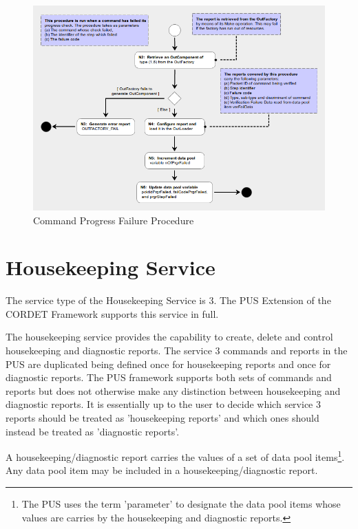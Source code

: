 \documentclass[a4paper,10pt]{article}
\let\stdsection\section
\renewcommand\section{\newpage\stdsection}
\begin{document}
\begin{figure}[H]
 \centering
 \includegraphics[scale=0.415,keepaspectratio=true]{CrPsCmdPrgrFail.png}
 \caption{Command Progress Failure Procedure}
 \label{fig:CmdPrgrFail}
\end{figure}

\section{Housekeeping Service}\label{sec:serv3}
The service type of the Housekeeping Service is 3. The PUS Extension of the CORDET Framework supports this service in full.

The housekeeping service provides the capability to create, delete and control housekeeping and diagnostic reports. The service 3 commands and reports in the PUS are duplicated being defined once for housekeeping reports and once for diagnostic reports. The PUS framework supports both sets of commands and reports but does not otherwise make any distinction between housekeeping and diagnostic reports. It is essentially up to the user to decide which service 3 reports should be treated as 'housekeeping reports' and which ones should instead be treated as 'diagnostic reports'.

A housekeeping/diagnostic report carries the values of a set of data pool items\footnote{The PUS uses the term 'parameter' to designate the data pool items whose values are carries by the housekeeping and diagnostic reports.}. Any data pool item may be included in a housekeeping/diagnostic report. 
\end{document}
